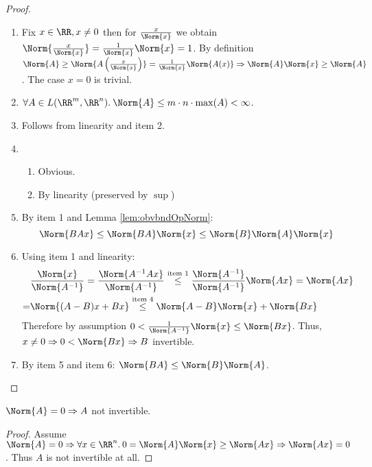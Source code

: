 \begin{proof}\ 
 \begin{enumerate}
  \item Fix $x\in\RR, x\neq 0$ then for $\frac{x}{\Norm{x}}$ we obtain $\Norm{\frac{x}{\Norm{x}}}=\frac{1}{\Norm{x}}\Norm{x}=1$. 
  By definition $\Norm{A}\geq \Norm{A\left(\frac{x}{\Norm{x}}\right)}=\frac{1}{\Norm{x}}\Norm{A(x)}\Rightarrow\Norm{A}\Norm{x}\geq\Norm{A}$. The case $x=0$ is trivial. 
  \item $\forall A\in L(\RR^m, \RR^n).\:\Norm{A}\leq m\cdot n\cdot \max(A)<\infty$.
  \item Follows from linearity and item 2.
  \item \begin{enumerate}
   \item Obvious.
   \item By linearity (preserved by $\sup$)
  \end{enumerate}
  \item By item 1 and Lemma \ref{lem:obvbndOpNorm}:
  \begin{equation}
   \label{eqn:bndCompOpNorm}
   \Norm{BAx}\leq \Norm{BA}\Norm{x}\leq \Norm{B}\Norm{A}\Norm{x}
  \end{equation}
  \item Using item 1 and linearity:
  \begin{align*}
   &\frac{\Norm{x}}{\Norm{A^{-1}}}=\frac{\Norm{A^{-1}Ax}}{\Norm{A^{-1}}}\overset{\text{item 1}}{\leq}\frac{\Norm{A^{-1}}}{\Norm{A^{-1}}}\Norm{Ax}=\Norm{Ax}\\
   =&\Norm{(A-B)x+Bx}\overset{\text{item 4}}{\leq}\Norm{A-B}\Norm{x}+\Norm{Bx}
  \end{align*}
  Therefore by assumption $0<\frac{1}{\Norm{A^{-1}}}\Norm{x}\leq\Norm{Bx}$.
  Thus, $x\neq 0\Rightarrow 0<\Norm{Bx}\Rightarrow B$ invertible. 
  \item By item 5 and item 6: $\Norm{BA}\leq\Norm{B}\Norm{A}$.  
 \end{enumerate}
\end{proof}
\begin{lem}
	$\Norm{A}=0\Rightarrow A$ not invertible.
\end{lem}
\begin{proof}
	Assume $\Norm{A}=0\Rightarrow \forall x\in\RR^n.\:0=\Norm{A}\Norm{x}\geq \Norm{Ax}\Rightarrow\Norm{Ax}=0$. Thus $A$ is not invertible at all.
\end{proof}
